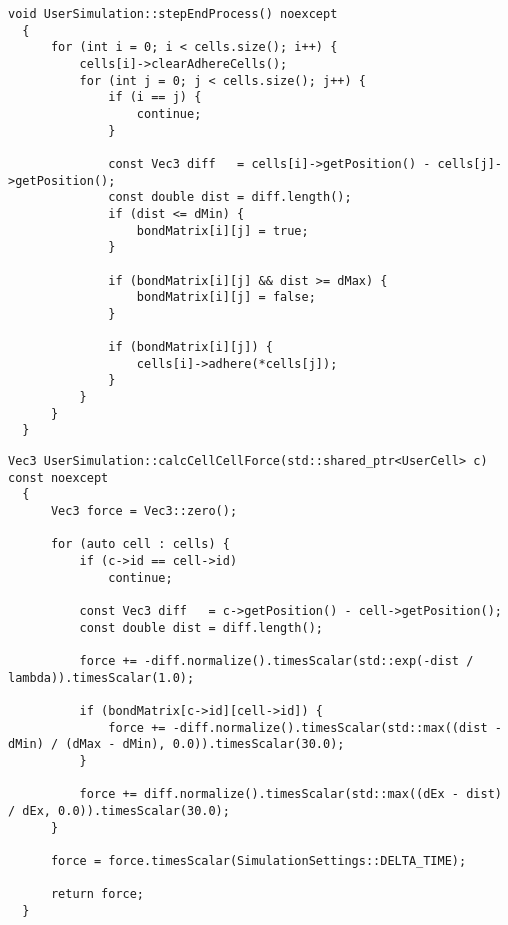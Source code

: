 \documentclass[vipdfmx,a4paper,11pt]{jsarticle}
\begin{document}
\begin{lstlisting}[caption=stepEndProcess()]
  void UserSimulation::stepEndProcess() noexcept
  {
      for (int i = 0; i < cells.size(); i++) {
          cells[i]->clearAdhereCells();
          for (int j = 0; j < cells.size(); j++) {
              if (i == j) {
                  continue;
              }

              const Vec3 diff   = cells[i]->getPosition() - cells[j]->getPosition();
              const double dist = diff.length();
              if (dist <= dMin) {
                  bondMatrix[i][j] = true;
              }

              if (bondMatrix[i][j] && dist >= dMax) {
                  bondMatrix[i][j] = false;
              }

              if (bondMatrix[i][j]) {
                  cells[i]->adhere(*cells[j]);
              }
          }
      }
  }
\end{lstlisting}

\begin{lstlisting}[caption=calcCellCellForce()]
  Vec3 UserSimulation::calcCellCellForce(std::shared_ptr<UserCell> c) const noexcept
  {
      Vec3 force = Vec3::zero();
  
      for (auto cell : cells) {
          if (c->id == cell->id)
              continue;
  
          const Vec3 diff   = c->getPosition() - cell->getPosition();
          const double dist = diff.length();
  
          force += -diff.normalize().timesScalar(std::exp(-dist / lambda)).timesScalar(1.0);
  
          if (bondMatrix[c->id][cell->id]) {
              force += -diff.normalize().timesScalar(std::max((dist - dMin) / (dMax - dMin), 0.0)).timesScalar(30.0);
          }
  
          force += diff.normalize().timesScalar(std::max((dEx - dist) / dEx, 0.0)).timesScalar(30.0);
      }
  
      force = force.timesScalar(SimulationSettings::DELTA_TIME);
  
      return force;
  }
\end{lstlisting}
\end{document}
